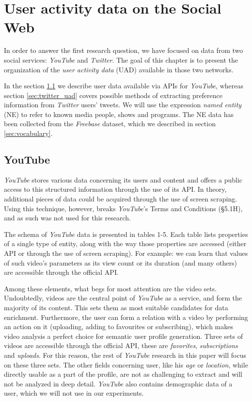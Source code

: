 \section{User activity data on the Social Web} 
\label{sec:uad}
In order to answer the first research question, we have focused on data from two social services: \textit{YouTube} and
\textit{Twitter}. The goal of this chapter is to present the organization of the \textit{user activity data} (UAD)
available in those two networks.

In the section \ref{sec:youtube_uad} we describe user data available via APIs for
\textit{YouTube}, whereas section \ref{sec:twitter_uad} covers possible methods of extracting preference information
from \textit{Twitter} users' tweets. We will use the expression \textit{named entity} (NE) to refer to
known media people, shows and programs. The NE data has been collected from the \textit{Freebase} dataset,
which we described in section \ref{sec:vocabulary}.

\subsection{YouTube}
\label{sec:youtube_uad}

\textit{YouTube} stores various data concerning its users and content and offers a public
access to this structured information through the use of its API. In theory, additional
pieces of data could be acquired through the use of screen scraping. Using this
technique, however, breaks \textit{YouTube}'s Terms and Conditions (\S 5.1H), and as such
was not used for this research.

The schema of \textit{YouTube} data is presented in tables 1-5.  Each table lists
properties of a single type of entity, along with the way those properties are
accessed (either API or through the use of screen scraping). For example:
we can learn that values of such video's parameters as its view count or
its duration (and many others) are accessible through the official API.

Among these elements, what begs for most attention are the video sets.
Undoubtedly, videos are the central point of \textit{YouTube} as a service, and form the
majority of its content. This sets them as most suitable candidates for data
enrichment. Furthermore, the user can form a relation with a video by performing
an action on it (uploading, adding to favourites or subscribing), which makes
video analysis a perfect choice for semantic user profile generation.  Three
sets of videos are accessible through the official API, these are
\emph{favorites}, \emph{subscriptions} and \emph{uploads}. For this reason, the
rest of \textit{YouTube} research in this paper will focus on these three sets. The other
fields concerning user, like his \textit{age} or \textit{location}, while
directly usable as a part of the profile, are not as challenging to extract and
will not be analyzed in deep detail. \textit{YouTube} also contains demographic data
of a user, which we will not use in our experiments.

